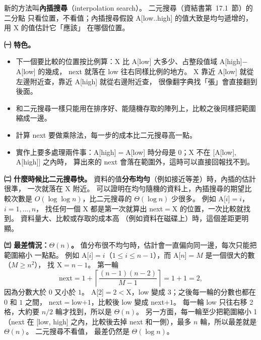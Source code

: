 \begin{pastsoln}
新的方法叫\textbf{內插搜尋}（interpolation search）。 二元搜尋（資結書第~17.1~節）的二分點
只看位置，不看值；內插搜尋假設 A[low..high] 的值大致是均勻遞增的，用 X 的值估計它「應該」
在哪個位置。

\textbf{㈠ 特色。}
\begin{itemize}
\item 下一個要比較的位置按比例算：X 比 A[low] 大多少、占整段值域 A[high]$-$A[low] 的幾成，
next 就落在 low 往右同樣比例的地方。 X 靠近 A[low] 就從左邊附近查，靠近 A[high] 就從右邊附近查，
很像翻字典找「張」會直接翻到後面。
\item 和二元搜尋一樣只能用在排序好、能隨機存取的陣列上，比較之後同樣把範圍縮成一邊。
\item 計算 next 要做乘除法，每一步的成本比二元搜尋高一點。
\item 實作上要多處理兩件事：A[high]$=$A[low] 時分母是 $0$；X 不在 [A[low], A[high]] 之內時，
算出來的 next 會落在範圍外，這時可以直接回報找不到。
\end{itemize}

\textbf{㈡ 什麼時候比二元搜尋快。} 資料的值\textbf{分布均勻}（例如接近等差）時，內插的估計很準，
一次就落在 X 附近。 可以證明在均勻隨機的資料上，內插搜尋的期望比較次數是
$O(\log\log n)$，比二元搜尋的 $\Theta(\log n)$ 少很多。 例如 A[$i$]$=i$，$i = 1, \dots, n$，
找任何一個 X 都是第一次就算出 next$=$X 的位置，一次比較就找到。 資料量大、比較或存取的成本高
（例如資料在磁碟上）時，這個差距更明顯。

\textbf{㈢ 最差情況：$\Theta(n)$。} 值分布很不均勻時，估計會一直偏向同一邊，每次只能把範圍縮小
一點點。 例如 A[$i$]$=i$（$1 \le i \le n-1$），而 A[$n$]$=M$ 是一個很大的數（$M \ge n^2$），
找 X$=n-1$。 第一輪
\[
\text{next} = 1 + \left\lceil \frac{(n-1)(n-2)}{M - 1} \right\rceil = 1 + 1 = 2,
\]
因為分數大於 $0$ 又小於 $1$。 A[2]$=2<$X，low 變成 3；之後每一輪的分數也都在 $0$ 和 $1$ 之間，
next$=$low$+1$，比較後 low 變成 next$+1$。 每一輪 low 只往右移 2 格，大約要 $n/2$ 輪才找到，所以是 $\Theta(n)$。 另一方面，每一輪至少把範圍縮小 1（next 在
[low, high] 之內，比較後去掉 next 和一側），最多 $n$ 輪，所以最差就是 $\Theta(n)$。 二元搜尋不看值，
最差仍然是 $\Theta(\log n)$。
\end{pastsoln}
